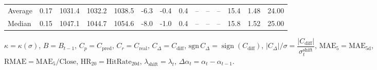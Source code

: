 \begin{threeparttable}
{\begin{tabular}{lrrrrrrrrrrrrr}
Average &     0.17 & 1031.4 & 1032.2 & 1038.5 &       -6.3 &                     -0.4 &                 0.4 &         -- &        -- &             -- &             15.4 &            1.48 &                  24.00 \\
 Median &     0.15 & 1047.1 & 1044.7 & 1054.6 &       -8.0 &                     -1.0 &                 0.4 &         -- &        -- &             -- &             15.8 &            1.52 &                  25.00 \\
\bottomrule
\end{tabular}
}
\begin{tablenotes}\footnotesize
\item $\kappa=\kappa(\sigma)$, $B=B_{t-1}$, $C_p=C_{\text{pred}}$, $C_r=C_{\text{real}}$, $C_\Delta=C_{\text{diff}}$, $\mathrm{sgn}\,C_\Delta=\operatorname{sign}(C_{\text{diff}})$, $|C_\Delta|/\sigma=\dfrac{|C_{\text{diff}}|}{\sigma_t^{\text{shift}}}$, $\mathrm{MAE}_5=\mathrm{MAE}_{5\text{d}}$, $\mathrm{RMAE}= \mathrm{MAE}_5 / \text{Close}$, $\mathrm{HR}_{20}=\mathrm{HitRate}_{20\text{d}}$, 
$\lambda_{\text{shift}}=\lambda_t$, 
$\Delta\alpha_t=\alpha_t-\alpha_{t-1}$.
\end{tablenotes}
\end{threeparttable}
\endgroup

